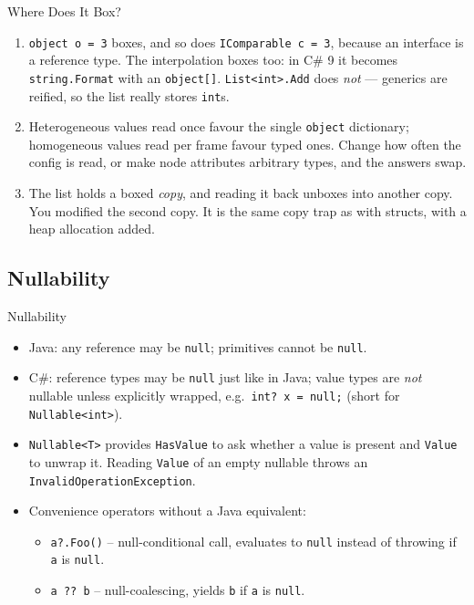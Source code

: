 \begin{solutionframe}{Where Does It Box?}
  \begin{enumerate}
    \item \texttt{object o = 3} boxes, and so does \texttt{IComparable c = 3},
      because an interface is a reference type. The interpolation boxes too:
      in C\# 9 it becomes \texttt{string.Format} with an \texttt{object[]}.
      \texttt{List<int>.Add} does \emph{not} --- generics are reified, so the
      list really stores \texttt{int}s.
    \item Heterogeneous values read once favour the single \texttt{object}
      dictionary; homogeneous values read per frame favour typed ones. Change
      how often the config is read, or make node attributes arbitrary types,
      and the answers swap.
    \item The list holds a boxed \emph{copy}, and reading it back unboxes into
      another copy. You modified the second copy. It is the same copy trap as
      with structs, with a heap allocation added.
  \end{enumerate}
\end{solutionframe}

\subsection{Nullability}

\begin{frame}{Nullability}
  \begin{itemize}
    \item Java: any reference may be \texttt{null}; primitives cannot be
      \texttt{null}.
    \item C\#: reference types may be \texttt{null} just like in Java;
      value types are \emph{not} nullable unless explicitly wrapped,
      e.g.\ \texttt{int?\ x = null;} (short for \texttt{Nullable<int>}).
    \item \texttt{Nullable<T>} provides \texttt{HasValue} to ask whether a value
      is present and \texttt{Value} to unwrap it. Reading \texttt{Value} of an
      empty nullable throws an \texttt{InvalidOperationException}.
    \item Convenience operators without a Java equivalent:
      \begin{itemize}
        \item \texttt{a?.Foo()} -- null-conditional call, evaluates to
          \texttt{null} instead of throwing if \texttt{a} is \texttt{null}.
        \item \texttt{a ?? b} -- null-coalescing, yields \texttt{b} if
          \texttt{a} is \texttt{null}.
      \end{itemize}
  \end{itemize}
\end{frame}

